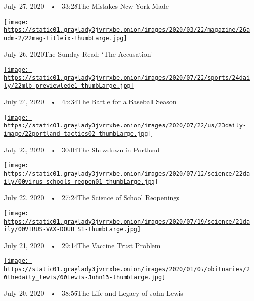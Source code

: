 July 27, 2020~~•~ 33:28The Mistakes New York Made

\href{https://www.nytimes3xbfgragh.onion/2020/07/26/podcasts/the-daily/the-accusation-the-sunday-read.html?action=click\&module=audio-series-bar\&region=header\&pgtype=Article}{\texttt{[image: https://static01.graylady3jvrrxbe.onion/images/2020/03/22/magazine/26audm-2/22mag-titleix-thumbLarge.jpg]}}

July 26, 2020The Sunday Read: `The Accusation'

\href{https://www.nytimes3xbfgragh.onion/2020/07/24/podcasts/the-daily/mlb-baseball-season-coronavirus.html?action=click\&module=audio-series-bar\&region=header\&pgtype=Article}{\texttt{[image: https://static01.graylady3jvrrxbe.onion/images/2020/07/22/sports/24daily/22mlb-previewlede1-thumbLarge.jpg]}}

July 24, 2020~~•~ 45:34The Battle for a Baseball Season

\href{https://www.nytimes3xbfgragh.onion/2020/07/23/podcasts/the-daily/portland-protests.html?action=click\&module=audio-series-bar\&region=header\&pgtype=Article}{\texttt{[image: https://static01.graylady3jvrrxbe.onion/images/2020/07/22/us/23daily-image/22portland-tactics02-thumbLarge.jpg]}}

July 23, 2020~~•~ 30:04The Showdown in Portland

\href{https://www.nytimes3xbfgragh.onion/2020/07/22/podcasts/the-daily/school-reopenings-coronavirus.html?action=click\&module=audio-series-bar\&region=header\&pgtype=Article}{\texttt{[image: https://static01.graylady3jvrrxbe.onion/images/2020/07/12/science/22daily/00virus-schools-reopen01-thumbLarge.jpg]}}

July 22, 2020~~•~ 27:24The Science of School Reopenings

\href{https://www.nytimes3xbfgragh.onion/2020/07/21/podcasts/the-daily/coronavirus-vaccine.html?action=click\&module=audio-series-bar\&region=header\&pgtype=Article}{\texttt{[image: https://static01.graylady3jvrrxbe.onion/images/2020/07/19/science/21daily/00VIRUS-VAX-DOUBTS1-thumbLarge.jpg]}}

July 21, 2020~~•~ 29:14The Vaccine Trust Problem

\href{https://www.nytimes3xbfgragh.onion/2020/07/20/podcasts/the-daily/john-lewis.html?action=click\&module=audio-series-bar\&region=header\&pgtype=Article}{\texttt{[image: https://static01.graylady3jvrrxbe.onion/images/2020/01/07/obituaries/20thedaily\_lewis/00Lewis-John13-thumbLarge.jpg]}}

July 20, 2020~~•~ 38:56The Life and Legacy of John Lewis

